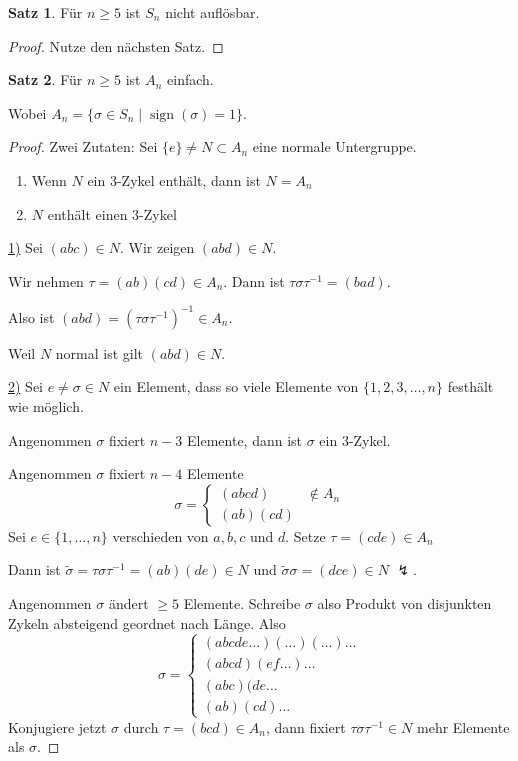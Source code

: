 \documentclass[12pt,parskip=full]{scrartcl}
\newcommand{\heading}{\underline}
\theoremstyle{definition}
\newtheorem{theorem}{Satz}[section]
\theoremstyle{remark}
\begin{document}
	\begin{theorem}
		Für $n \geq 5$ ist $S_n$ nicht auflösbar.
	\end{theorem}
	
	\begin{proof}
		Nutze den nächsten Satz.
	\end{proof}

	\begin{theorem}
		Für $n \geq 5$ ist $A_n$ einfach.
		
		Wobei $A_n = \{ \sigma \in S_n \mid \operatorname{sign}(\sigma) = 1 \}$.
	\end{theorem}

	\begin{proof}
		Zwei Zutaten: Sei $\{ e \} \neq N \subset A_n$ eine normale Untergruppe.
		\begin{enumerate}
			\item Wenn $N$ ein $3$-Zykel enthält, dann ist $N = A_n$
			\item $N$ enthält einen $3$-Zykel
		\end{enumerate}
	
		\heading{1)} Sei $(a b c) \in N$. Wir zeigen $(a b d) \in N$.
		
		Wir nehmen $\tau = (ab)(cd) \in A_n$. Dann ist $\tau \sigma \tau^{-1} = (b a d)$.
		
		Also ist $(a b d) = (\tau \sigma \tau^{-1})^{-1} \in A_n$.
		
		Weil $N$ normal ist gilt $(a b d) \in N$.
		
		\heading{2)} Sei $e \neq \sigma \in N$ ein Element, dass so viele Elemente von $\{ 1, 2, 3, \dots, n \}$ festhält wie möglich.
		
		Angenommen $\sigma$ fixiert $n-3$ Elemente, dann ist $\sigma$ ein $3$-Zykel.
		
		Angenommen $\sigma$ fixiert $n-4$ Elemente
		\begin{equation*}
			\sigma = \begin{cases}
				(a b c d) & \notin A_n \\
				(a b)(c d)
			\end{cases}
		\end{equation*}
		Sei $e \in \{ 1, \dots, n\}$ verschieden von $a,b,c$ und $d$. Setze $\tau = (c d e) \in A_n$
	
		Dann ist $\tilde{\sigma} = \tau \sigma \tau^{-1} = (ab)(de) \in N$ und $\tilde{\sigma} \sigma = (d c e) \in N$ $\lightning$.
		
		Angenommen $\sigma$ ändert $\geq 5$ Elemente. Schreibe $\sigma$ also Produkt von disjunkten Zykeln absteigend geordnet nach Länge. Also
		\begin{equation*}
			\sigma = \begin{cases}
				(a b c d e \dots)(\dots)(\dots) \dots \\
				(a b c d) (e f \dots) \dots \\
				(a b c) (d e \dots \\
				(a b) (c d) \dots
			\end{cases}
		\end{equation*}
		Konjugiere jetzt $\sigma$ durch $\tau = (bcd) \in A_n$, dann fixiert $\tau \sigma \tau^{-1} \in N$ mehr Elemente als $\sigma$.
		

\end{proof}
\end{document}
